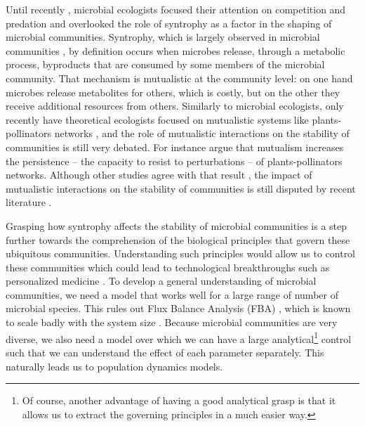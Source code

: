\documentclass[12pt, titlepage]{report}
\begin{document}
Until recently \cite{morris_microbial_2013}, microbial ecologists focused their attention on competition and predation and overlooked the role of syntrophy as a factor in the shaping of microbial communities. Syntrophy, which is largely observed in microbial communities \cite{morris_microbial_2013}, by definition occurs when microbes release, through a metabolic process, byproducts that are consumed by some members of the microbial community. That mechanism is mutualistic at the community level: on one hand microbes release metabolites for others, which is costly, but on the other they receive additional resources from others. Similarly to microbial ecologists, only recently have theoretical ecologists focused on mutualistic systems like plants-pollinators networks \cite{bastolla_architecture_2009, rohr_structural_2014}, and the role of mutualistic interactions on the stability of communities is still very debated. For instance \citeauthor{bastolla_architecture_2009} argue that mutualism increases the persistence -- \ie the capacity to resist to perturbations -- of plants-pollinators networks. Although other studies agree with that result \cite{rohr_structural_2014, thebault_stability_2010}, the impact of mutualistic interactions on the stability of communities is still disputed by recent literature \cite{james_disentangling_2012}.

Grasping how syntrophy affects the stability of microbial communities is a step further towards the comprehension of the biological principles that govern these ubiquitous communities. Understanding such principles would allow us to control these communities which could lead to technological breakthroughs such as personalized medicine \cite{kashyap_microbiome_2017}. To develop a general understanding of microbial communities, we need a model that works well for a large range of number of microbial species. This rules out Flux Balance Analysis (FBA) \cite{orth_what_2010}, which is known to scale badly with the system size \cite{thiele_multiscale_2012}. Because microbial communities are very diverse, we also need a model over which we can have a large analytical\footnote{Of course, another advantage of having a good analytical grasp is that it allows us to extract the governing principles in a much easier way.} control such that we can understand the effect of each parameter separately.  This naturally leads us to population dynamics models.
\end{document}
